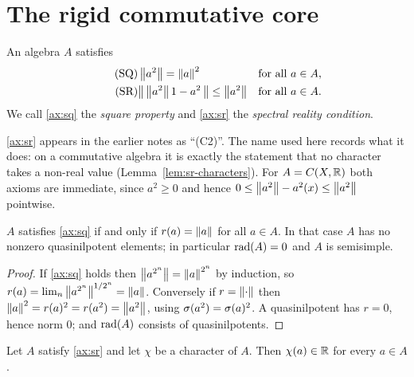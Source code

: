 \section{The rigid commutative core}
\label{sec:rigid}

\begin{definition}\label{def:rigid}
An algebra $A$ satisfies
\begin{align}
  \tag{SQ}\label{ax:sq}
  &\left\lVert a^2\right\rVert=\left\lVert a\right\rVert^2 &&\text{for all } a\in A, \\
  \tag{SR}\label{ax:sr}
  &\bigl\lVert\,\left\lVert a^2\right\rVert1-a^2\,\bigr\rVert\le\left\lVert a^2\right\rVert &&\text{for all } a\in A .
\end{align}
We call \eqref{ax:sq} the \emph{square property} and \eqref{ax:sr} the
\emph{spectral reality condition}.
\end{definition}

\begin{remark}
\eqref{ax:sr} appears in the earlier notes as ``(C2)''.  The name used here
records what it does: on a commutative algebra it is exactly the statement that
no character takes a non-real value (Lemma~\ref{lem:sr-characters}).  For
$A=C(X,\mathbb{R})$ both axioms are immediate, since $a^2\ge0$ and hence
$0\le\left\lVert a^2\right\rVert-a^2(x)\le\left\lVert a^2\right\rVert$ pointwise.
\end{remark}

\begin{lemma}
\label{lem:sq-radius}
$A$ satisfies \eqref{ax:sq} if and only if $r(a)=\left\lVert a\right\rVert$ for all $a\in A$.  In
that case $A$ has no nonzero quasinilpotent elements; in particular
$\operatorname{rad}(A)=0$ and $A$ is semisimple.
\end{lemma}

\begin{proof}
If \eqref{ax:sq} holds then $\left\lVert a^{2^n}\right\rVert=\left\lVert a\right\rVert^{2^n}$ by induction, so
$r(a)=\lim_n\left\lVert a^{2^n}\right\rVert^{1/2^n}=\left\lVert a\right\rVert$.  Conversely if $r=\left\lVert\cdot\right\rVert$
then $\left\lVert a\right\rVert^2=r(a)^2=r(a^2)=\left\lVert a^2\right\rVert$, using $\operatorname{\sigma}(a^2)=\operatorname{\sigma}(a)^2$.  A
quasinilpotent has $r=0$, hence norm $0$; and $\operatorname{rad}(A)$ consists of
quasinilpotents.
\end{proof}

\begin{lemma}\label{lem:sr-characters}
Let $A$ satisfy \eqref{ax:sr} and let $\chi$ be a character of $A$.  Then
$\chi(a)\in\mathbb{R}$ for every $a\in A$.
\end{lemma}

